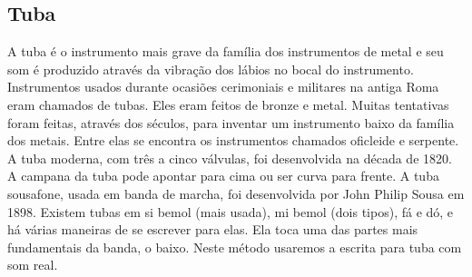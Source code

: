 \subsection*{Tuba}

A tuba é o instrumento mais grave da família dos instrumentos de
metal e seu som é produzido através da vibração dos lábios no bocal do
instrumento. Instrumentos usados durante ocasiões cerimoniais e
militares na antiga Roma eram chamados de tubas. Eles eram feitos de
bronze e metal. Muitas tentativas foram feitas, através dos séculos,
para inventar um instrumento baixo da família dos metais. Entre elas
se encontra os instrumentos chamados oficleide e serpente. A tuba
moderna, com três a cinco válvulas, foi desenvolvida na década de
1820. A campana da tuba pode apontar para cima ou ser curva para
frente. A tuba sousafone, usada em banda de marcha, foi desenvolvida
por John Philip Sousa em 1898. Existem tubas em si bemol (mais usada),
mi bemol (dois tipos), fá e dó, e há várias maneiras de se escrever
para elas. Ela toca uma das partes mais fundamentais da banda, o
baixo. Neste método usaremos a escrita para tuba com som real.
